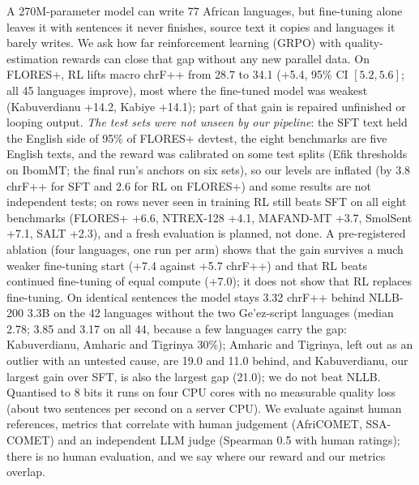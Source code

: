 \noindent A 270M-parameter model can write 77 African languages, but fine-tuning alone leaves it with sentences it never finishes, source text it copies and languages it barely writes. We ask how far reinforcement learning (GRPO) with quality-estimation rewards can close that gap without any new parallel data. On FLORES+, RL lifts macro chrF++ from 28.7 to 34.1 (+5.4, 95\% CI $[5.2, 5.6]$; all 45 languages improve), most where the fine-tuned model was weakest (Kabuverdianu +14.2, Kabiye +14.1); part of that gain is repaired unfinished or looping output. \emph{The test sets were not unseen by our pipeline}: the SFT text held the English side of 95\% of FLORES+ devtest, the eight benchmarks are five English texts, and the reward was calibrated on some test splits (Efik thresholds on IbomMT; the final run's anchors on six sets), so our levels are inflated (by 3.8 chrF++ for SFT and 2.6 for RL on FLORES+) and some results are not independent tests; on rows never seen in training RL still beats SFT on all eight benchmarks (FLORES+ +6.6, NTREX-128 +4.1, MAFAND-MT +3.7, SmolSent +7.1, SALT +2.3), and a fresh evaluation is planned, not done. A pre-registered ablation (four languages, one run per arm) shows that the gain survives a much weaker fine-tuning start (+7.4 against +5.7 chrF++) and that RL beats continued fine-tuning of equal compute (+7.0); it does not show that RL replaces fine-tuning. On identical sentences the model stays 3.32 chrF++ behind NLLB-200 3.3B on the 42 languages without the two Ge'ez-script languages (median 2.78; 3.85 and 3.17 on all 44, because a few languages carry the gap: Kabuverdianu, Amharic and Tigrinya 30\%); Amharic and Tigrinya, left out as an outlier with an untested cause, are 19.0 and 11.0 behind, and Kabuverdianu, our largest gain over SFT, is also the largest gap (21.0); we do not beat NLLB. Quantised to 8 bits it runs on four CPU cores with no measurable quality loss (about two sentences per second on a server CPU). We evaluate against human references, metrics that correlate with human judgement (AfriCOMET, SSA-COMET) and an independent LLM judge (Spearman 0.5 with human ratings); there is no human evaluation, and we say where our reward and our metrics overlap.
